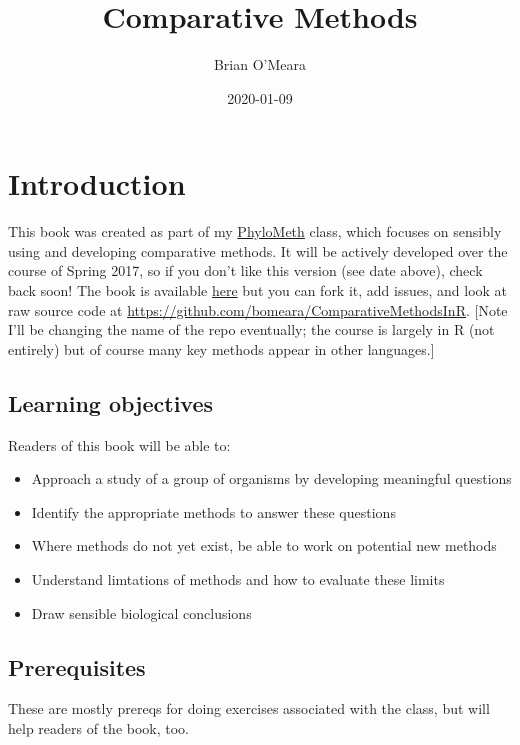 \documentclass[
]{article}
\title{Comparative Methods}
\author{Brian O'Meara}
\date{2020-01-09}
\providecommand{\tightlist}{%
  \setlength{\itemsep}{0pt}\setlength{\parskip}{0pt}}
\begin{document}
\maketitle

{
\setcounter{tocdepth}{2}
\tableofcontents
}
\hypertarget{introduction}{%
\section{Introduction}\label{introduction}}

This book was created as part of my \href{http://phylometh.info}{PhyloMeth} class, which focuses on sensibly using and developing comparative methods. It will be actively developed over the course of Spring 2017, so if you don't like this version (see date above), check back soon! The book is available \href{https://bookdown.org/bomeara/comparative-methods/}{here} but you can fork it, add issues, and look at raw source code at \url{https://github.com/bomeara/ComparativeMethodsInR}. {[}Note I'll be changing the name of the repo eventually; the course is largely in R (not entirely) but of course many key methods appear in other languages.{]}

\hypertarget{learning-objectives}{%
\subsection{Learning objectives}\label{learning-objectives}}

Readers of this book will be able to:

\begin{itemize}
\tightlist
\item
  Approach a study of a group of organisms by developing meaningful questions
\item
  Identify the appropriate methods to answer these questions
\item
  Where methods do not yet exist, be able to work on potential new methods
\item
  Understand limtations of methods and how to evaluate these limits
\item
  Draw sensible biological conclusions
\end{itemize}

\hypertarget{prerequisites}{%
\subsection{Prerequisites}\label{prerequisites}}

These are mostly prereqs for doing exercises associated with the class, but will help readers of the book, too.
\end{document}
